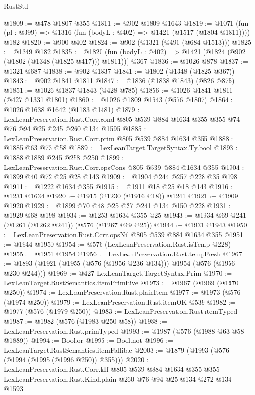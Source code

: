 \begin{lexlean}{RustStd}
\begin{coremodule}
@1809 := @478 @1807 @355
@1811 := @902 @1809 @1643
@1819 := @1071 (fun (pl : @399) => @1316 (fun (bodyL : @402) => @1421 (@1517 (@1804 @1811)))) @182
@1820 := @900 @402
@1824 := @902 (@1321 (@490 (@684 @1513)))
@1825 := @1349 @182
@1835 := @1820 (fun (bodyL : @402) => @1421 (@1824 (@902 (@1802 (@1348 (@1825 @417))) @1811))) @367
@1836 := @1026 @878
@1837 := @1321 @687
@1838 := @902 @1837
@1841 := @1802 (@1348 (@1825 @367))
@1843 := @902 @1841 @1811
@1847 := @1836 (@1838 @1843) (@826 @875)
@1851 := @1026 @1837 @1843 (@428 @785)
@1856 := @1026 @1841 @1811 (@427 @1331 @1801)
@1860 := @1026 @1809 @1643 (@576 @1807)
@1864 := @1026 @1638 @1642 (@1183 @1481)
@1879 := LexLeanPreservation.Rust.Corr.cond
    @805
    @539
    @884
    @1634
    @355
    @355
    @74
    @76
    @94
    @25
    @245
    @260
    @134
    @1595
@1885 := LexLeanPreservation.Rust.Corr.prim @805 @539 @884 @1634 @355
@1888 := @1885 @63 @73 @58
@1889 := LexLeanTarget.TargetSyntax.Ty.bool
@1893 := @1888 @1889 @245 @258 @250
@1899 := LexLeanPreservation.Rust.Corr.opsCons @805 @539 @884 @1634 @355
@1904 := @1899 @40 @72 @25 @28 @143
@1909 := @1904 @244 @257 @228 @35 @198
@1911 := @1222 @1634 @355
@1915 := @1911 @18 @25 @18 @143
@1916 := @1231 @1634
@1920 := @1915 (@1230 (@1916 @18)) @1241
@1921 := @1909 @1920
@1929 := @1899 @70 @48 @25 @27 @241 @134 @150 @228
@1931 := @1929 @68 @198
@1934 := @1253 @1634 @355 @25
@1943 := @1934 @69 @241 (@1261 (@1262 @241)) (@576 (@1267 @69 @25))
@1944 := @1931 @1943
@1950 := LexLeanPreservation.Rust.Corr.opsNil @805 @539 @884 @1634 @355
@1951 := @1944 @1950
@1954 := @576 (LexLeanPreservation.Rust.isTemp @228)
@1955 := @1951 @1954
@1956 := LexLeanPreservation.Rust.tempFresh
@1967 := @1893 (@1921 (@1955 (@576 (@1956 @236 @134))) @1954 (@576 (@1956 @230 @244)))
@1969 := @427 LexLeanTarget.TargetSyntax.Prim
@1970 := LexLeanTarget.RustSemantics.itemPrimitive
@1973 := @1967 (@1969 (@1970 @250))
@1974 := LexLeanPreservation.Rust.plainItem
@1977 := @1973 (@576 (@1974 @250))
@1979 := LexLeanPreservation.Rust.itemOK @539
@1982 := @1977 (@576 (@1979 @250))
@1983 := LexLeanPreservation.Rust.itemTyped
@1987 := @1982 (@576 (@1983 @250 @58))
@1988 := LexLeanPreservation.Rust.primTyped
@1993 := @1987 (@576 (@1988 @63 @58 @1889))
@1994 := Bool.or
@1995 := Bool.not
@1996 := LexLeanTarget.RustSemantics.itemFallible
@2003 := @1879 (@1993 (@576 (@1994 (@1995 (@1996 @250)) @355)))
@2020 := LexLeanPreservation.Rust.Corr.kIf
    @805
    @539
    @884
    @1634
    @355
    @355
    LexLeanPreservation.Rust.Kind.plain
    @260
    @76
    @94
    @25
    @134
    @272
    @134
    @1593

\end{coremodule}
\end{lexlean}
